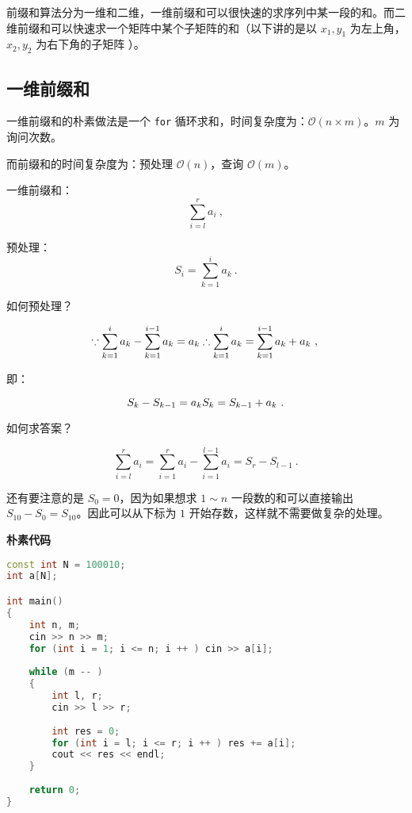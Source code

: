 
前缀和算法分为一维和二维，一维前缀和可以很快速的求序列中某一段的和。而二维前缀和可以快速求一个矩阵中某个子矩阵的和（以下讲的是以 $x_1, y_1$ 为左上角，$x_2, y_2$ 为右下角的子矩阵 ）。

\subsection{一维前缀和}
一维前缀和的朴素做法是一个 \verb`for` 循环求和，时间复杂度为：$\mathcal{O}(n \times m)$。$m$ 为询问次数。

而前缀和的时间复杂度为：预处理 $\mathcal{O}(n)$，查询 $\mathcal{O}(m)$。

一维前缀和：
\begin{equation}
\sum^{r}_{i=l}a_i~,
\end{equation}

预处理：
\begin{equation}
S_i=\sum^{i}_{k=1}a_k~.
\end{equation}

如何预处理？

\begin{equation}
\because 
\sum^{i}_{k=1}a_k-\sum^{i-1}_{k=1}a_{k}=a_k \\
 \therefore \sum^{i}_{k=1}a_k=\sum^{i-1}_{k=1}a_{k}+a_k ~,\\
\end{equation}

即：

\begin{equation}
\\S_k-S_{k-1}=a_k\\
 \\S_k=S_{k-1}+a_k~.\\
\end{equation}

如何求答案？

\begin{equation}
\sum^{r}_{i=l}a_i=\sum^{r}_{i=1}a_i-\sum^{l-1}_{i=1}a_i=S_r-S_{l-1}~.
\end{equation}

还有要注意的是 $S_0 = 0$，因为如果想求 $1 \sim n$ 一段数的和可以直接输出 $S_{10} - S_0 = S_{10} $。因此可以从下标为 $1$ 开始存数，这样就不需要做复杂的处理。

\textbf{朴素代码}
\begin{lstlisting}[language=cpp]
const int N = 100010;
int a[N];

int main()
{
    int n, m;
    cin >> n >> m;
    for (int i = 1; i <= n; i ++ ) cin >> a[i];
    
    while (m -- )
    {
        int l, r;
        cin >> l >> r;
        
        int res = 0;
        for (int i = l; i <= r; i ++ ) res += a[i];
        cout << res << endl;
    }
    
    return 0;
}
\end{lstlisting}

